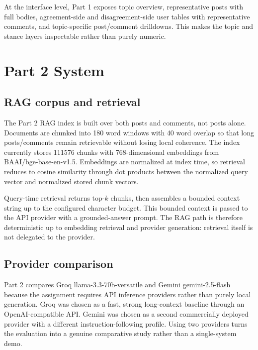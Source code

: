 \documentclass[11pt]{article}
\begin{document}
        At the interface level, Part 1 exposes topic overview, representative posts with full bodies, agreement-side and disagreement-side user tables with representative comments, and topic-specific post/comment drilldowns. This makes the topic and stance layers inspectable rather than purely numeric.

        \section*{Part 2 System}
        \subsection*{RAG corpus and retrieval}
        The Part 2 RAG index is built over both posts and comments, not posts alone. Documents are chunked into 180 word windows with 40 word overlap so that long posts/comments remain retrievable without losing local coherence. The index currently stores 111576 chunks with 768-dimensional embeddings from BAAI/bge-base-en-v1.5. Embeddings are normalized at index time, so retrieval reduces to cosine similarity through dot products between the normalized query vector and normalized stored chunk vectors.

        Query-time retrieval returns top-$k$ chunks, then assembles a bounded context string up to the configured character budget. This bounded context is passed to the API provider with a grounded-answer prompt. The RAG path is therefore deterministic up to embedding retrieval and provider generation: retrieval itself is not delegated to the provider.

        \subsection*{Provider comparison}
        Part 2 compares Groq llama-3.3-70b-versatile and Gemini gemini-2.5-flash because the assignment requires API inference providers rather than purely local generation. Groq was chosen as a fast, strong long-context baseline through an OpenAI-compatible API. Gemini was chosen as a second commercially deployed provider with a different instruction-following profile. Using two providers turns the evaluation into a genuine comparative study rather than a single-system demo.
\end{document}

